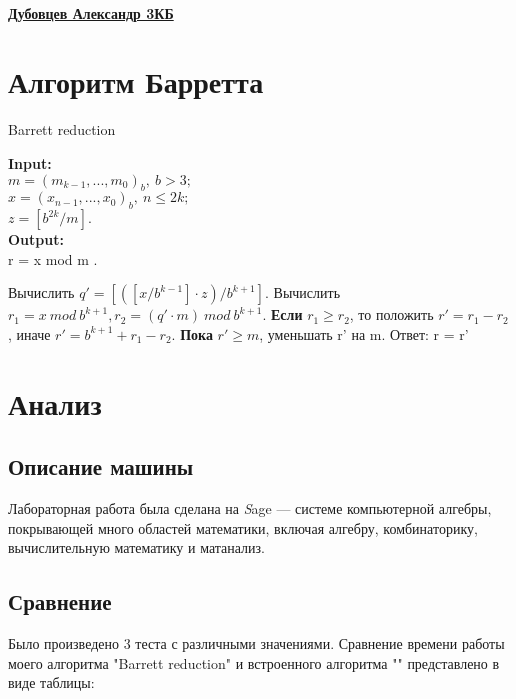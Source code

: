 \documentclass[11pt]{article}
\begin{document}
\linespread{1.3}


\begin{center}	
	\linespread{1.9}
	\vspace*{4mm}
	\\ {\bf \underline{Дубовцев Александр 3КБ}}
\end{center}
	

\section{Алгоритм Барретта }

\begin{algorithm}
	
	\caption{Barrett reduction}
	\label{alg:AlgName}
	\textbf{Input:}\\
	$m = (m_{k-1},...,m_{0})_{b},\: b > 3;$ \\
	$x = (x_{n-1},...,x_{0})_{b},\:n	\leq 2k;$ \\
	$z = [b^{2k}/m].$ \\
	\textbf{Output:}\\
	r = x mod m .
	
	\begin{algorithmic}[1]
		
		\State Вычислить $q' = [([x/b^{k-1}] \cdot z)/b^{k+1}]$. 
		\State Вычислить $r_{1} = x\:mod\:b^{k+1}, r_{2} = (q' \cdot m)\: mod\: b^{k+1} $.
		\State \textbf{Если} {$r_{1} \geq r_{2}$}, то положить $r'=r_{1}-r_{2}$, иначе $r'=b^{k+1}+r_{1}-r_{2} $.
		\State \textbf{Пока} $r' \geq m$, уменьшать r' на m.
		\State Ответ: r = r'
		
	\end{algorithmic}

\end{algorithm}

\newpage

\section{Анализ}
\subsection{Описание машины}

Лабораторная работа была сделана на {\textit Sage} — системе компьютерной алгебры, покрывающей много областей математики, включая алгебру, комбинаторику, вычислительную математику и матанализ.

\subsection{Сравнение}
Было произведено 3 теста с различными значениями. Сравнение времени работы моего алгоритма "Barrett reduction" и встроенного алгоритма "" представлено в виде таблицы: 
\\
\end{document}
